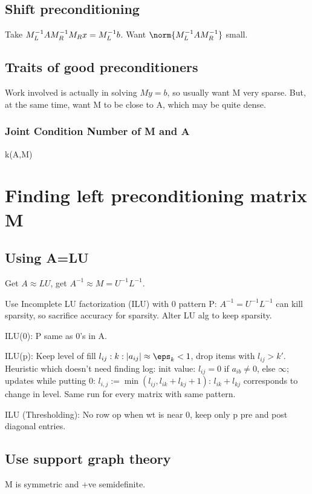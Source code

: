 \documentclass[oneside, article]{memoir}
\begin{document}
\subsection{Shift preconditioning}
Take $M_{L}^{-1}AM_{R}^{-1}M_{R}x = \\
M_{L}^{-1}b$. Want $\norm{M_{L}^{-1}AM_{R}^{-1}}$ small.

\subsection{Traits of good preconditioners}
Work involved is actually in solving $My = b$, so usually want M very sparse. But, at the same time, want M to be close to A, which may be quite dense.

\subsubsection{Joint Condition Number of M and A}
k(A,M)

\section{Finding left preconditioning matrix M}
\subsection{Using A=LU}
Get $A \approx LU$, get $A^{-1} \approx M = U^{-1}L^{-1}$.

Use Incomplete LU factorization (ILU) with 0 pattern P: $A^{-1} = U^{-1}L^{-1}$ can kill sparsity, so sacrifice accuracy for sparsity. Alter LU alg to keep sparsity.

ILU(0): P same as 0's in A.

ILU(p): Keep level of fill $l_{ij}: k: |a_{ij}| \approx \eps_{k}<1$, drop items with $l_{ij}>k'$. Heuristic which doesn't need finding log: init value: $l_{ij} = 0$ if $a_{ib}\neq 0$, else $\infty$; updates while putting 0: $l_{i,j} := \min (l_{ij}, l_{ik}+ l_{kj} + 1)$: $l_{ik}+ l_{kj} $ corresponds to change in level. Same run for every matrix with same pattern.

ILU (Thresholding): No row op when wt is near 0, keep only p pre and post diagonal entries.

\subsection{Use support graph theory}
M is symmetric and +ve semidefinite.
\end{document}
